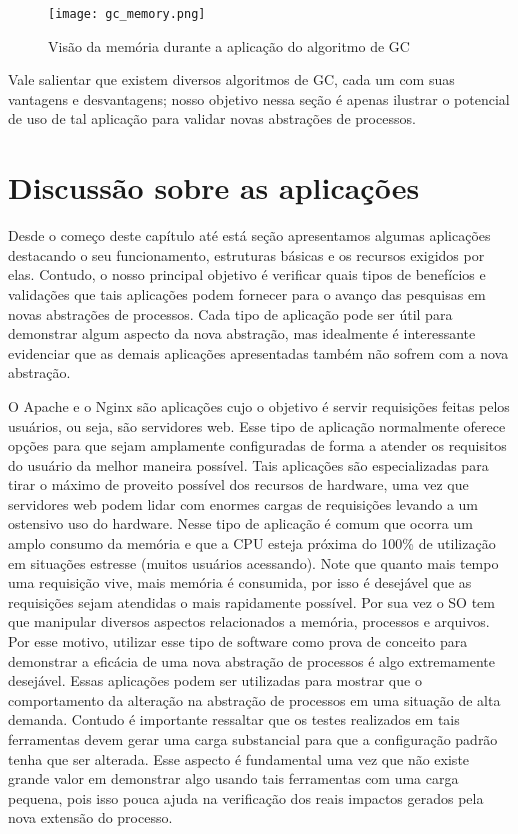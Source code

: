 \begin{figure}[!h]
  \centering
  \texttt{[image: gc\_memory.png]}
  \caption{Visão da memória durante a aplicação do algoritmo de GC\citep{gc_basics}}
  \label{fig:gc_mem}
\end{figure}

Vale salientar que existem diversos algoritmos de GC, cada um com suas
vantagens e desvantagens; nosso objetivo nessa seção é apenas ilustrar o
potencial de uso de tal aplicação para validar novas abstrações de processos.

\section{Discussão sobre as aplicações}
\label{sec:disc_app}

Desde o começo deste capítulo até está seção apresentamos algumas aplicações
destacando o seu funcionamento, estruturas básicas e os recursos exigidos por
elas. Contudo, o nosso principal objetivo é verificar quais tipos de benefícios
e validações que tais aplicações podem fornecer para o avanço das pesquisas em
novas abstrações de processos. Cada tipo de aplicação pode ser útil para
demonstrar algum aspecto da nova abstração, mas idealmente é interessante
evidenciar que as demais aplicações apresentadas também não sofrem com a nova
abstração.

O Apache e o Nginx são aplicações cujo o objetivo é servir requisições feitas
pelos usuários, ou seja, são servidores web. Esse tipo de aplicação normalmente
oferece opções para que sejam amplamente configuradas de forma a atender os
requisitos do usuário da melhor maneira possível. Tais aplicações são
especializadas para tirar o máximo de proveito possível dos recursos de hardware,
uma vez que servidores web podem lidar com enormes cargas de requisições
levando a um ostensivo uso do hardware. Nesse tipo de aplicação é comum que
ocorra um amplo consumo da memória e que a CPU esteja próxima do 100\% de
utilização em situações estresse (muitos usuários acessando).  Note que quanto
mais tempo uma requisição vive, mais memória é consumida, por isso é desejável
que as requisições sejam atendidas o mais rapidamente possível. Por sua vez o
SO tem que manipular diversos aspectos relacionados a memória, processos e
arquivos. Por esse motivo, utilizar esse tipo de software como prova de
conceito para demonstrar a eficácia de uma nova abstração de processos é algo
extremamente desejável. Essas aplicações podem ser utilizadas para mostrar que
o comportamento da alteração na abstração de processos em uma situação de alta
demanda. Contudo é importante ressaltar que os testes realizados em tais
ferramentas devem gerar uma carga substancial para que a configuração padrão
tenha que ser alterada. Esse aspecto é fundamental uma vez que não existe
grande valor em demonstrar algo usando tais ferramentas com uma carga pequena,
pois isso pouca ajuda na verificação dos reais impactos gerados pela nova
extensão do processo.

